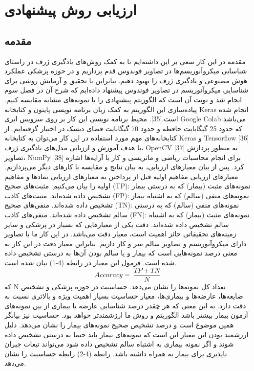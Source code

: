 \chapter{ارزیابی روش پیشنهادی}
\section{مقدمه}


مقدمه
در این کار سعی بر این داشته‌ایم تا به کمک روش‌های یادگیری ژرف در راستای شناسایی میکروآنوریسم‌ها در تصاویر فوندوس قدم برداریم و در حوزه پزشکی عملکرد هوش مصنوعی و یادگیری ژرف را بهبود دهیم. بنابراین با تحقیق و آزمایش روشی برای شناسایی میکروآنوریسم در تصاویر فوندوس پیشنهاد داده‌ایم که شرح آن در فصل سوم انجام شد و نوبت آن است که الگوریتم پیشنهادی را با نمونه‌های مشابه مقایسه کنیم.
پیاده‌سازی این الگوریتم به کمک زبان برنامه‌ نویسی پایتون و کتابخانه Keras انجام شده است.[35]. محیط برنامه نویسی این کار بر روی سرویس ابری Google Colab می‌باشد که حدود 25 گیگابایت حافظه و حدود 70 گیگابایت فضای دیسک در اختیار گرفته‌ایم.
از کتابخانه‌های مهم مورد استفاده در این کار می‌‌توان به کتابخانه Keras و Tensorflow [36] با هدف آموزش و ارزیابی مدل‌های یادگیری ژرف، OpenCV [37] به منظور پردازش تصاویر، NumPy [38] برای انجام محاسبات ریاضی و ماتریسی و کار با آرایه‌ها اشاره کرد.
پس از بیان معیارهای ارزیابی، به بیان نتایج و مقایسه با کارهای دیگر می‌پردازیم.
معیارهای ارزیابی
مفاهیم اولیه
قبل از پرداختن به معیارهای ارزیابی نمادها و مفاهیم اولیه را بیان می‌کنیم:
	مثبت‌های صحیح  (TP): نمونه‌های مثبت (بیمار) که به درستی بیمار تشخیص داده شده‌اند.
	مثبت‌های کاذب  (FP): نمونه‌های منفی (سالم) که به اشتباه بیمار تشخیص داده شده‌اند.
	منفی‌های صحیح  (TN): نمونه‌های منفی (سالم) که به درستی سالم تشخیص داده شده‌اند.
	منفی‌های کاذب  (FN): نمونه‌های مثبت (بیمار) که به اشتباه سالم تشخیص داده شده‌اند.
دقت
یکی از معیارهایی که بسیار در پزشکی و سایر زمینه‌های تحقیقاتی حائز اهمیت است، معیار دقت می‌باشد. در این کار ما با تصاویر دارای میکروآنوریسم و تصاویر سالم سر و کار داریم. بنابراین معیار دقت در این کار به معنی درصد نمونه‌هایی است که بیمار و یا سالم بودن آن‌ها به درستی تشخیص داده شده است. فرمول این معیار در رابطه (4-1) بیان شده است.
\begin{equation}\label{eq3-1}
Accuracy=\ \frac{TP+TN}{N}
\end{equation}
که N تعداد کل نمونه‌ها را نشان می‌دهد.
حساسیت 
در حوزه پزشکی و تشخیص ضایعه‌ها، عارضه‌ها و بیماری‌ها، معیار حساسیت بسیار اهمیت ویژه و بالاتری نسبت به دقت دارد. به این معنی که هر چقدر درصد شناسایی عارضه یا بیماری از بین نمونه‌های آزمون بیمار بیشتر باشد الگوریتم و روش ما ارزشمندتر خواهد بود. حساسیت نیز بیانگر همین موضوع است و درصد تشخیص صحیح نمونه‌های بیمار را نشان می‌دهد. 
دلیل ارزشمند بودن این معیار این است که نمونه‌های بیمار باید حتما به درستی تشخیص داده شوند و اگر نمونه بیماری به اشتباه سالم تشخیص داده شود می‌تواند تبعات جبران ناپذیری برای بیمار به همراه داشته باشد. رابطه      (4-2) رابطه حساسیت را نشان می‌دهد.


